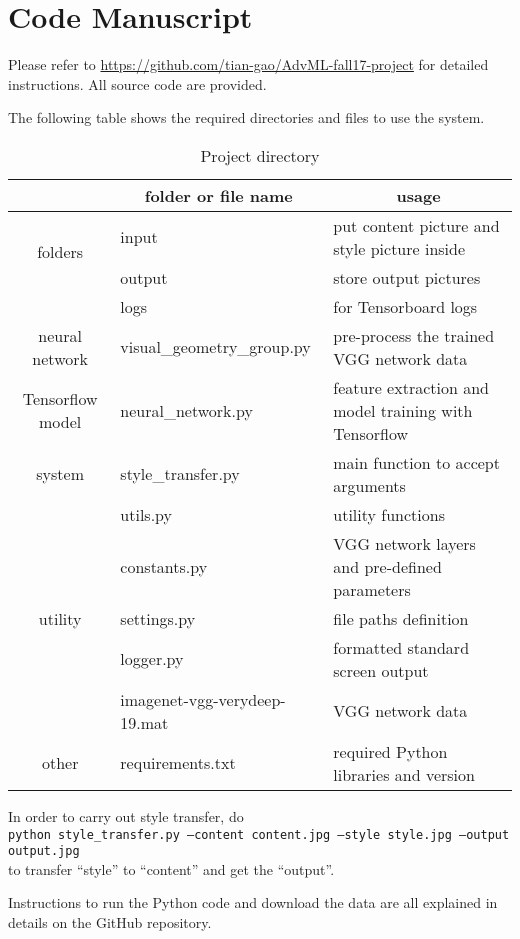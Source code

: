 \chapter{Code Manuscript}
\label{app:readme}


Please refer to \url{https://github.com/tian-gao/AdvML-fall17-project} for detailed instructions.
All source code are provided.

The following table shows the required directories and files to use the system.

	\begin{table}[!htb]
	\center
	\begin{tabular}{c|l|l}
	\hline
	& \multicolumn{1}{c|}{folder or file name} & \multicolumn{1}{c}{usage} \\ \hline
	\multirow{2}{*}{folders}
		& input & put content picture and style picture inside \\
		& output & store output pictures \\ 
		& logs & for Tensorboard logs \\ \hline
	neural network & visual\_geometry\_group.py & pre-process the trained VGG network data \\ \hline
	Tensorflow model & neural\_network.py &
		feature extraction and model training with Tensorflow \\ \hline
	system & style\_transfer.py & main function to accept arguments \\ \hline
	\multirow{5}{*}{utility}
		& utils.py & utility functions \\
		& constants.py & VGG network layers and pre-defined parameters \\
		& settings.py & file paths definition \\
		& logger.py & formatted standard screen output \\ \hline
	data & imagenet-vgg-verydeep-19.mat & VGG network data \\
	other & requirements.txt & required Python libraries and version \\
	\hline
	\end{tabular}
	\caption{Project directory}
	\label{table:layers}
	\end{table}

In order to carry out style transfer, do \\
	\texttt{python style\_transfer.py --content content.jpg --style style.jpg --output output.jpg} \\
to transfer ``style'' to ``content'' and get the ``output''.


Instructions to run the Python code and download the data
are all explained in details on the GitHub repository.
